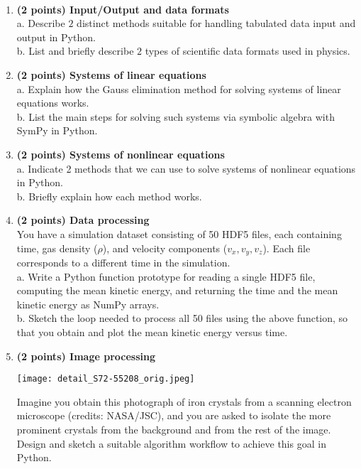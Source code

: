 \documentclass[12pt,a4paper]{article}
\begin{document}
\\
\vspace{-0.5cm}
\begin{enumerate}

\item {\bf (2 points) Input/Output and data formats}\\
a. Describe $2$ distinct methods suitable for handling tabulated data input and output in Python.\\
b. List and briefly describe $2$ types of scientific data formats used in physics.\vspace{5.7cm}


\item {\bf (2 points) Systems of linear equations}\\
a. Explain how the Gauss elimination method for solving systems of linear equations works.\\
b. List the main steps for solving such systems via symbolic algebra with SymPy in Python.\vspace{5.7cm}


\item {\bf (2 points) Systems of nonlinear equations}\\
a. Indicate 2 methods that we can use to solve systems of nonlinear equations in Python.\\
b. Briefly explain how each method works.\newpage

\item {\bf (2 points) Data processing}\\
You have a simulation dataset consisting of  50 HDF5 files, each containing time, gas density ($\rho$), and velocity components ($v_x, v_y, v_z$). Each file corresponds to a different time in the simulation.\\
a. Write a Python function prototype for reading a single HDF5 file, computing the mean kinetic energy, and returning the time and the mean kinetic energy as NumPy arrays.\\
b. Sketch the loop needed to process all 50 files using the above function, so that you obtain and plot the mean kinetic energy versus time.\vspace{9cm}

\item {\bf (2 points) Image processing}\vspace{0.1cm}

\begin{minipage}{0.35\textwidth}
    \centering
    \hspace{-1.3cm}\texttt{[image: detail\_S72-55208\_orig.jpeg]}
\end{minipage}%
\hspace{0.02\textwidth}
\begin{minipage}{0.45\textwidth}
Imagine you obtain this photograph of iron crystals from a scanning electron microscope (credits: NASA/JSC), and you are asked to isolate the more prominent crystals from the background and from the rest of the image. Design and sketch a suitable algorithm workflow to achieve this goal in Python.
\end{minipage}

\end{enumerate}
\end{document}
